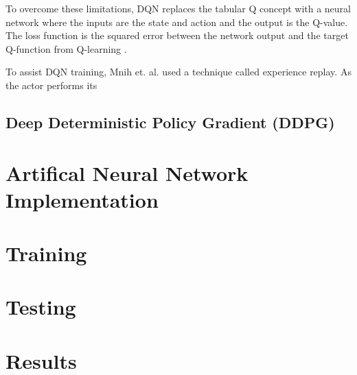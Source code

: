To overcome these limitations, DQN replaces the tabular Q concept with a neural network where the inputs are the state and action and the output is the Q-value. The loss function is the squared error between the network output and the target Q-function from Q-learning \cite{Mnih_2015}.

To assist DQN training, Mnih et. al. used a technique called experience replay. As the actor performs its 

\subsection{Deep Deterministic Policy Gradient (DDPG)}





\section{Artifical Neural Network Implementation}

\section{Training}

\section{Testing}

\section{Results}

